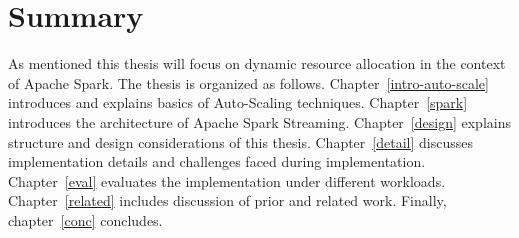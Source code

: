 \section{Summary}
As mentioned this thesis will focus on dynamic resource allocation in the context of Apache Spark. The thesis is organized as follows. Chapter~\ref{intro-auto-scale} introduces and explains basics of Auto-Scaling techniques. Chapter~\ref{spark} introduces the architecture of Apache Spark Streaming. Chapter~\ref{design} explains structure and design considerations of this thesis. Chapter~\ref{detail} discusses implementation details and challenges faced during implementation. Chapter~\ref{eval} evaluates the implementation under different workloads. Chapter~\ref{related} includes discussion of prior and related work. Finally, chapter~\ref{conc} concludes.
